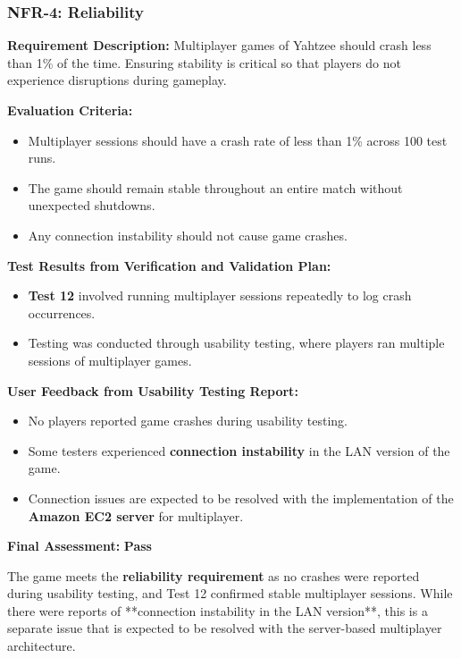 \documentclass[12pt, titlepage]{article}
\begin{document}
\subsubsection{NFR-4: Reliability}
\label{NFR4}

\textbf{Requirement Description:}  
Multiplayer games of Yahtzee should crash less than 1\% of the time. Ensuring stability is critical so that players do not experience disruptions during gameplay.

\textbf{Evaluation Criteria:}  
\begin{itemize}
    \item Multiplayer sessions should have a crash rate of less than 1\% across 100 test runs.
    \item The game should remain stable throughout an entire match without unexpected shutdowns.
    \item Any connection instability should not cause game crashes.
\end{itemize}

\textbf{Test Results from Verification and Validation Plan:}  
\begin{itemize}
    \item \textbf{Test 12} involved running multiplayer sessions repeatedly to log crash occurrences.
    \item Testing was conducted through usability testing, where players ran multiple sessions of multiplayer games.
\end{itemize}

\textbf{User Feedback from Usability Testing Report:}  
\begin{itemize}
    \item No players reported game crashes during usability testing.
    \item Some testers experienced \textbf{connection instability} in the LAN version of the game.
    \item Connection issues are expected to be resolved with the implementation of the \textbf{Amazon EC2 server} for multiplayer.
\end{itemize}

\textbf{Final Assessment:} \textbf{Pass}  

The game meets the \textbf{reliability requirement} as no crashes were reported during usability testing, and Test 12 confirmed stable multiplayer sessions. While there were reports of **connection instability in the LAN version**, this is a separate issue that is expected to be resolved with the server-based multiplayer architecture.
\end{document}
